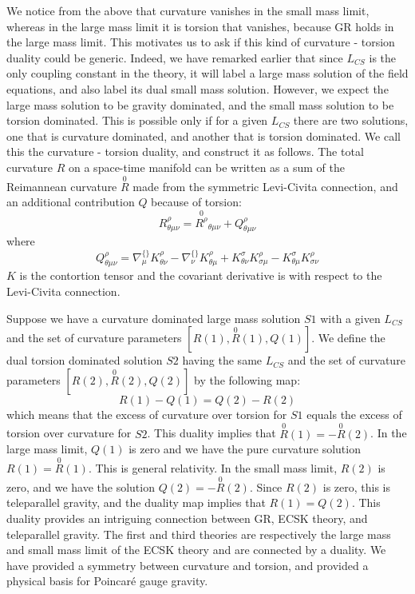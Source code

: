 \documentclass[prd, preprint, 12pt]{revtex4-1}
\begin{document}
We notice from the above that curvature vanishes in the small mass limit, whereas in the large mass limit it is torsion that vanishes, because GR holds in the large mass limit. This motivates us to ask if this kind of curvature - torsion duality could be generic. Indeed, we have remarked earlier that since $L_{CS}$ is the only coupling constant in the theory, it will label a large mass solution of the field equations, and also label its dual small mass solution. However, we expect the large mass solution to be gravity dominated, and the small mass solution to be torsion dominated. This is possible only if for a given $L_{CS}$ there are two solutions, one that is curvature dominated, and another that is torsion dominated. We call this the curvature - torsion duality, and construct it as follows. The total curvature $R$ on a space-time manifold can be written as a sum of the Reimannean 
  curvature $\overset{0}{R}$ made from the symmetric Levi-Civita connection, and an additional contribution $Q$ because of torsion:
  \begin{equation}
  R^{\rho}_{\theta\mu\nu} = \overset{0}{R^{\rho}}_{\theta\mu\nu} + Q^{\rho}_{\theta\mu\nu}
  \end{equation}
where
\begin{equation}
Q^{\rho}_{\theta\mu\nu} = \nabla^{\{\}}_\mu K^{\rho}_{\theta\nu} - \nabla^{\{\}}_\nu K^{\rho}_{\theta\mu} + K^{\sigma}_{\theta\nu} K^{\rho}_{\sigma\mu} - K^{\sigma}_{\theta\mu} K^{\rho}_{\sigma\nu}
\end{equation}
$K$ is the contortion tensor and the covariant derivative is with respect to the Levi-Civita connection.

Suppose we have a curvature dominated large mass solution $S1$ with a given $L_{CS}$ and the set of curvature parameters
$[R(1),\overset{0}{R}(1), Q(1)]$. We define the dual torsion dominated solution $S2$ having the same $L_{CS}$ and the set of
curvature parameters $[R(2), \overset{0}{R}(2),Q(2)]$ by the following map:
\begin{equation}
R(1) - Q (1)  = Q (2) - R(2)
\end{equation}
which means that the excess of curvature over torsion for $S1$ equals the excess of torsion over curvature for $S2$. This duality 
implies that $\overset{0}{R}(1)= - \overset{0}{R}(2)$. In the large mass limit, $Q(1)$ is zero and we have the pure curvature solution $R(1) = \overset{0}{R}(1)$. This is general relativity. In the small mass limit, $R(2)$ is zero, and we have the solution
$Q(2) = - \overset{0}{R}(2)$. Since $R(2)$ is zero, this is teleparallel gravity, and the duality map implies that $R(1) = Q(2)$. This duality provides an intriguing connection between GR, ECSK theory, and teleparallel gravity. The first and third theories are respectively the large mass and small mass limit of the ECSK theory and are connected by a duality. We have provided a symmetry between curvature and torsion, and provided a physical basis for Poincar\'e gauge gravity.
\end{document}
